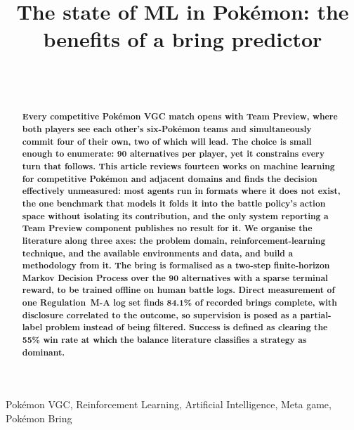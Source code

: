 \documentclass[conference]{IEEEtran}
\begin{document}
\title{The state of ML in Pokémon: the benefits of a bring predictor\\
}

\author{
\\
\\

}


\maketitle


\begin{abstract}
\textbf{Every competitive Pok\'emon VGC match opens with Team Preview, where both
players see each other's six-Pok\'emon teams and simultaneously commit four of
their own, two of which will lead. The choice is small enough to enumerate: 90 alternatives per player, yet it constrains every turn that follows. This article reviews fourteen works on machine learning for competitive Pok\'emon
and adjacent domains and finds the decision effectively unmeasured: most agents
run in formats where it does not exist, the one benchmark that models it folds
it into the battle policy's action space without isolating its contribution,
and the only system reporting a Team Preview component publishes no result for
it. We organise the literature along three axes: the problem domain,
reinforcement-learning technique, and the available environments and data, and build a methodology from it. The bring is formalised as a two-step finite-horizon Markov Decision Process over the 90 alternatives with a sparse
terminal reward, to be trained offline on human battle logs. Direct measurement
of one Regulation~M-A log set finds 84.1\% of recorded brings complete, with
disclosure correlated to the outcome, so supervision is posed as a partial-label
problem instead of being filtered. Success is defined as clearing the 55\% win
rate at which the balance literature classifies a strategy as dominant.}

\end{abstract}

\begin{IEEEkeywords}
Pokémon VGC, Reinforcement Learning, Artificial Intelligence, Meta game, Pokémon Bring

\end{IEEEkeywords}
\end{document}
